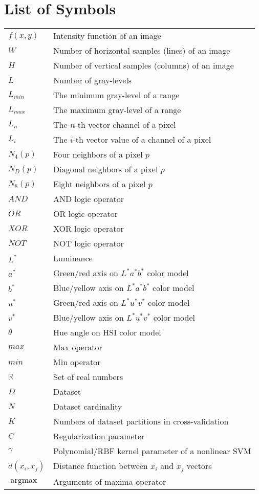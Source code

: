 \documentclass[11pt,twoside,a4paper]{book}
\theoremstyle{plain}
\theoremstyle{definition}
\DeclareMathOperator*{\argmax}{argmax}
\begin{document}
\chapter{List of Symbols}
\begin{tabular}{ll}
    $f(x, y)$   & Intensity function of an image \\
    $W$         & Number of horizontal samples (lines) of an image \\
    $H$         & Number of vertical samples (columns) of an image \\
    $L$         & Number of gray-levels \\
    $L_{min}$   & The minimum gray-level of a range \\
    $L_{max}$   & The maximum gray-level of a range \\
    $L_n$       & The $n$-th vector channel of a pixel \\
    $L_i$       & The $i$-th vector value of a channel of a pixel \\
    $N_4(p)$    & Four neighbors of a pixel $p$ \\
    $N_D(p)$    & Diagonal neighbors of a pixel $p$ \\
    $N_8(p)$    & Eight neighbors of a pixel $p$ \\
    $AND$       & AND logic operator \\
    $OR$        & OR logic operator \\
    $XOR$       & XOR logic operator \\
    $NOT$       & NOT logic operator \\
    $L^*$       & Luminance \\
    $a^*$       & Green/red axis on $L^*a^*b^*$ color model \\
    $b^*$       & Blue/yellow axis on $L^*a^*b^*$ color model \\
    $u^*$       & Green/red axis on $L^*u^*v^*$ color model \\
    $v^*$       & Blue/yellow axis on $L^*u^*v^*$ color model \\
    $\theta$    & Hue angle on HSI color model \\
    $max$       & Max operator \\
    $min$       & Min operator \\
    $\mathbb{R}$& Set of real numbers \\
    $D$         & Dataset \\
    $N$         & Dataset cardinality \\
    $K$         & Numbers of dataset partitions in cross-validation \\
    $C$         & Regularization parameter \\
    $\gamma$    & Polynomial/RBF kernel parameter of a nonlinear SVM \\
    $d(x_i, x_j)$ & Distance function between $x_i$ and $x_j$ vectors \\
    $\argmax$   & Arguments of maxima operator \\
\end{tabular}
\end{document}
